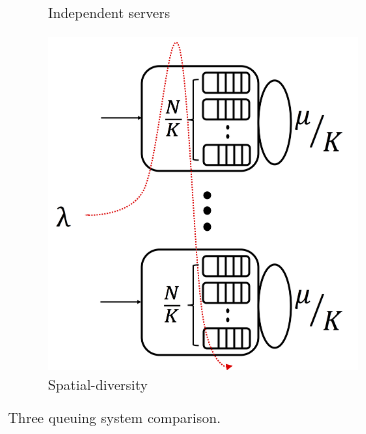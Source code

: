 \begin{figure}
\begin{subfigure}[b]{0.3\textwidth}
		\caption{Independent servers}
		\label{fig:enn}
	\end{subfigure}
	\hfill
	\begin{subfigure}[b]{0.3\textwidth}
		\centering
		\includegraphics[width=0.9\textwidth]{Chapter3/Figures/sdmlfq}
		\caption{Spatial-diversity}
		\label{fig:sdmlfq}
	\end{subfigure}
	\caption{Three queuing system comparison.} %
	\label{fig:three-system-comparison}
\end{figure}
